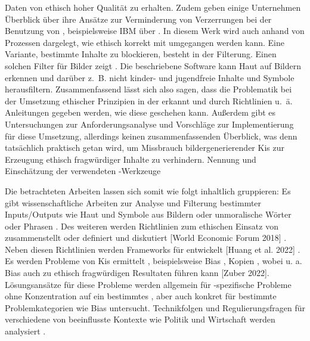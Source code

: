 Daten von ethisch hoher Qualität zu erhalten.
Zudem geben einige Unternehmen Überblick über ihre Ansätze zur Verminderung von Verzerrungen bei der Benutzung von , 
beispielsweise IBM über \cite{Hobson}. In diesem Werk wird auch anhand von Prozessen dargelegt, wie ethisch korrekt mit  
umgegangen werden kann.
Eine Variante, bestimmte Inhalte zu blockieren, besteht in der Filterung. Einen solchen Filter für Bilder zeigt \cite{Zheng}.
Die beschriebene Software kann Haut auf Bildern erkennen und darüber z. B. nicht kinder- und jugendfreie Inhalte und Symbole herausfiltern.
Zusammenfassend lässt sich also sagen, dass die Problematik bei der Umsetzung ethischer Prinzipien in der  erkannt und
durch Richtlinien u. ä. Anleitungen gegeben werden, wie diese geschehen kann. Außerdem gibt es Untersuchungen 
zur Anforderungsanalyse und Vorschläge zur Implementierung für diese Umsetzung, allerdings keinen zusammenfassenden 
Überblick, was denn tatsächlich praktisch getan wird, um Missbrauch bildergenerierender Kis zur Erzeugung ethisch 
fragwürdiger Inhalte zu verhindern.
Nennung und Einschätzung der verwendeten -Werkzeuge

Die betrachteten Arbeiten lassen sich somit wie folgt inhaltlich gruppieren: Es gibt wissenschaftliche Arbeiten zur Analyse und Filterung
bestimmter Inputs/Outputs wie Haut und Symbole aus Bildern \cite{Zheng} oder unmoralische Wörter oder Phrasen \cite{Shah}. Des weiteren 
werden Richtlinien zum ethischen Einsatz von  zusammenstellt oder definiert und diskutiert \cite{Ayling} \cite{Srinivasan} 
\cite{Jameel} \cite{Hagendorff} \cite{Jobin} \cite{Unity} \cite{EUCommision}[World Economic Forum 2018] \cite{Mueller}.
Neben diesen Richtlinien werden Frameworks für  entwickelt [Huang et al. 2022] \cite{Mueller}. Es werden Probleme von Kis ermittelt \cite{Ayling}, 
beispielsweise Bias \cite{Salminen} \cite{Jameel}, Kopien \cite{Somepalli}, wobei u. a. Bias auch zu ethisch 
fragwürdigen Resultaten führen kann [Zuber 2022]. Lösungsansätze für diese Probleme werden allgemein für -spezifische Probleme ohne 
Konzentration auf ein bestimmtes \cite{Ayling} \cite{Avelar}, aber auch konkret für bestimmte Problemkategorien wie Bias \cite{Srinivasan}
\cite{Jameel}untersucht. Technikfolgen und Regulierungsfragen für verschiedene von  beeinflusste Kontexte wie Politik und Wirtschaft
werden analysiert \cite{Pawelec}.

